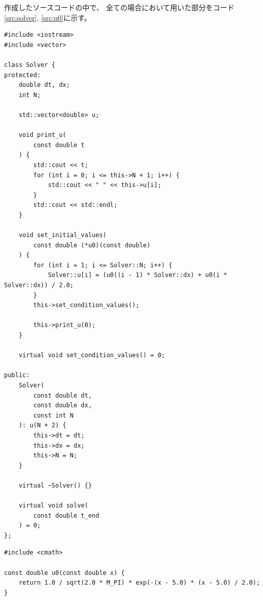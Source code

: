 \documentclass[a4j, titlepage]{jsarticle}
\numberwithin{equation}{section}
\begin{document}
        作成したソースコードの中で、
        全ての場合において用いた部分をコード\ref{src:solver}, \ref{src:u0}に示す。
        \begin{lstlisting}[caption=solver.h, label=src:solver]
#include <iostream>
#include <vector>

class Solver {
protected:
    double dt, dx;
    int N;

    std::vector<double> u;

    void print_u(
        const double t
    ) {
        std::cout << t;
        for (int i = 0; i <= this->N + 1; i++) {
            std::cout << " " << this->u[i];
        }
        std::cout << std::endl;
    }

    void set_initial_values(
        const double (*u0)(const double)
    ) {
        for (int i = 1; i <= Solver::N; i++) {
            Solver::u[i] = (u0((i - 1) * Solver::dx) + u0(i * Solver::dx)) / 2.0;
        }
        this->set_condition_values();

        this->print_u(0);
    }

    virtual void set_condition_values() = 0;

public:
    Solver(
        const double dt,
        const double dx,
        const int N
    ): u(N + 2) {
        this->dt = dt;
        this->dx = dx;
        this->N = N;
    }

    virtual ~Solver() {}

    virtual void solve(
        const double t_end
    ) = 0;
};\end{lstlisting}
        \begin{lstlisting}[caption=$u_0(x)$の実装, label=src:u0]
#include <cmath>

const double u0(const double x) {
    return 1.0 / sqrt(2.0 * M_PI) * exp(-(x - 5.0) * (x - 5.0) / 2.0);
}
        \end{lstlisting}
\end{document}
